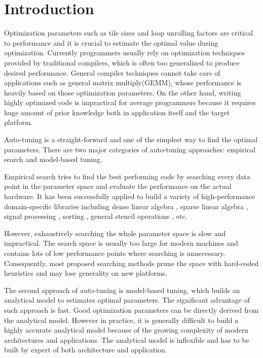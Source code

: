 \section{Introduction}
\label{sec:intro}


Optimization parameters such as tile sizes and loop unrolling factors are critical to performance and it
is crucial to estimate the optimal value during optimization.
Currently programmers usually rely on optimization techniques provided by traditional compilers, which
is often too generalized to produce desired performance.
General compiler techniques cannot take care of applications such as general matrix multiply(GEMM),
whose performance is heavily based on those optimization parameters.
On the other hand, writing highly optimized code is impractical for average
programmers because it requires huge amount of prior knowledge both in application
itself and the target platform.


\par

Auto-tuning is a straight-forward and one of the simplest way to find the optimal parameters.
There are two major categories of auto-tuning approaches: empirical search and model-based tuning.
\par
Empirical search tries to find the best performing code by searching every data point in
the parameter space and evaluate the performance on the actual hardware.
It has been successfully applied to build a variety
of high-performance domain-specific libraries including
dense linear algebra \cite{whaley2001automated}\cite{bilmes2014optimizing},
sparse linear algebra \cite{vuduc2005oski}, signal processing
\cite{frigo2005design}\cite{puschel2005spiral}, sorting \cite{li2004dynamically},
general stencil operations \cite{kamil2010auto}, etc.
\par
However, exhaustively searching the whole parameter space is slow and impractical.
The search space is usually too large for modern machines and contains lots of low performance points where
searching is unnecessary. Consequently, most proposed searching methods
prune the space with hard-coded heuristics and may lose generality on new platforms.

\par
The second approach of auto-tuning is model-based tuning, which builds an analytical model
to estimates optimal parameters. The significant advantage of such approach is fast. Good optimization
parameters can be directly derived from the analytical model.
However in practice, it is generally difficult to build a highly accurate analytical model because of the growing complexity
of modern architectures and applications. The analytical model is inflexible and has to be built by expert of both architecture
and application.

